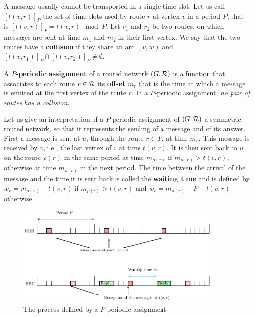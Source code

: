 \documentclass[a4paper,10pt,french,english]{article}
\begin{document}
 A message usually cannot be transported in a single time slot. Let us call $[t(v,r)]_{P}$ the set of time slots used by route $r$ at vertex $v$ in a period $P$, that is $[t(v,r)]_{P} = t(v,r)  \mod P $. Let $r_1$ and $r_2$ be two routes, on which messages are sent at time $m_1$ and $m_2$ in their first vertex.
      We say that the two routes have a {\bf collision} if they share an arc $(v,w)$ and $[t(v,r_{1})]_{P} \cap [t(v,r_{2})]_{P} \neq \emptyset$.
      
         A {\bf $P$-periodic assignment} of a routed network $(G,\cal R)$ is a function that associates to each route 
         $r \in \cal R$ its \textbf{offset} $m_r$ that is the time at which a message is emitted at the first vertex of the route $r$.  In a $P$-periodic assignment, \emph{no pair of routes has a collision}.
                     
                     Let us give an interpretation of a $P$-periodic assignment of $(G,{\cal R})$ a symmetric routed network, so that it represents the sending of a message and of its answer.
	First a message is sent at $u$, through the route $r \in F$, at time $m_r$.
      This message is received by $v$, i.e., the last vertex of $r$ at time $t(v,r)$. It is then sent back to $u$ on the route $\rho(r)$ in the same period at time $m_{\rho(r)}$ if $m_{\rho(r)} > t(v,r)$, otherwise at time $m_{\rho(r)}$ in the next period. The time between the arrival of the message and the time it is sent back is called the \textbf{waiting time} and is defined by $w_r = m_{\rho(r)} - t(v,r)$ if $m_{\rho(r)} > t(v,r)$ and $w_r = m_{\rho(r)} + P - t(v,r)$ otherwise.
      \begin{figure}[h]
      \begin{center}
      \includegraphics[width=0.9\textwidth]{rrh.pdf}
      \end{center}
      \caption{The process defined by a $P$-periodic assignment}
      \end{figure}
\end{document}
